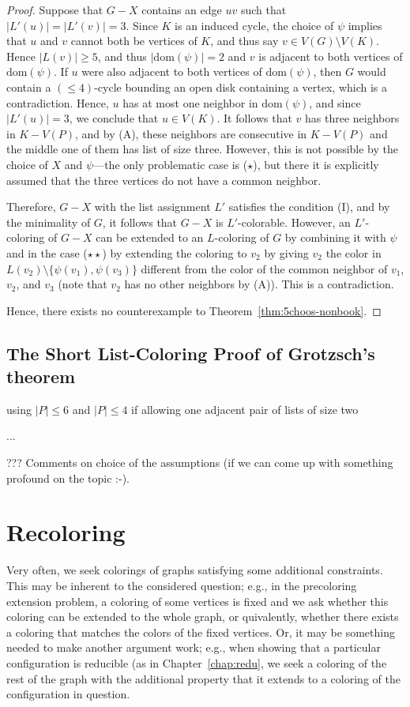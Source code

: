 \documentclass[12pt,twoside,openright,a4paper]{book}
\begin{document}
\begin{proof}
Suppose that $G-X$ contains an edge $uv$ such that $|L'(u)|=|L'(v)|=3$.  Since $K$ is an induced cycle, the choice of $\psi$
implies that $u$ and $v$ cannot both be vertices of $K$, and thus say $v\in V(G)\setminus V(K)$.  Hence $|L(v)|\ge 5$,
and thus $|\text{dom}(\psi)|=2$ and $v$ is adjacent to both vertices of $\text{dom}(\psi)$.  If $u$ were also adjacent
to both vertices of $\text{dom}(\psi)$, then $G$ would contain a $(\le\!4)$-cycle bounding an open disk containing a vertex,
which is a contradiction.  Hence, $u$ has at most one neighbor in $\text{dom}(\psi)$, and since $|L'(u)|=3$,
we conclude that $u\in V(K)$.  It follows that $v$ has three neighbors in $K-V(P)$, and by (A),
these neighbors are consecutive in $K-V(P)$ and the middle one of them has list of size three.
However, this is not possible by the choice of $X$ and $\psi$---the only problematic case is ($\star$), but
there it is explicitly assumed that the three vertices do not have a common neighbor.

Therefore, $G-X$ with the list assignment $L'$ satisfies the condition (I), and by the minimality of $G$, it
follows that $G-X$ is $L'$-colorable.  However, an $L'$-coloring of $G-X$ can be extended to an $L$-coloring of $G$
by combining it with $\psi$ and in the case ($\star\star$) by extending the coloring to $v_2$ by giving
$v_2$ the color in $L(v_2)\setminus \{\psi(v_1),\psi(v_3)\}$ different from the color of the common neighbor
of $v_1$, $v_2$, and $v_3$ (note that $v_2$ has no other neighbors by (A)).  This is a contradiction.

Hence, there exists no counterexample to Theorem~\ref{thm:5choos-nonbook}.
\end{proof}

\section{The Short List-Coloring Proof of Grotzsch's theorem}

using $|P|\le 6$ and $|P|\le 4$ if allowing one adjacent pair of lists of size two

...

??? Comments on choice of the assumptions (if we can come up with something profound on the topic :-).

\chapter{Recoloring}\label{chap:recolor}

Very often, we seek colorings of graphs satisfying some additional constraints.
This may be inherent to the considered question; e.g., in the precoloring extension problem,
a coloring of some vertices is fixed and we ask whether this coloring can be extended to the
whole graph, or quivalently, whether there exists a coloring that matches the colors of the fixed
vertices.  Or, it may be something needed to make another argument work; e.g., when showing that
a particular configuration is reducible (as in Chapter~\ref{chap:redu}, we seek a coloring of the rest
of the graph with the additional property that it extends to a coloring of the configuration in question.
\end{document}
